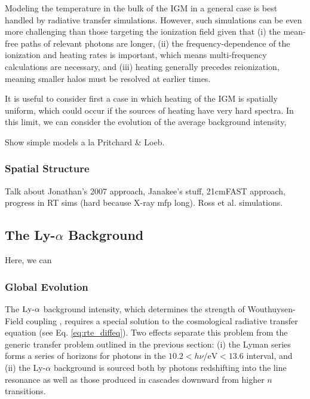 Modeling the temperature in the bulk of the IGM in a general case is best handled by radiative transfer simulations. However, such simulations can be even more challenging than those targeting the ionization field given that (i) the mean-free paths of relevant photons are longer, (ii) the frequency-dependence of the ionization and heating rates is important, which means multi-frequency calculations are necessary, and (iii) heating generally precedes reionization, meaning smaller halos must be resolved at earlier times. 

It is useful to consider first a case in which heating of the IGM is spatially uniform, which could occur if the sources of heating have very hard spectra. In this limit, we can consider the evolution of the average background intensity,



Show simple models a la Pritchard \& Loeb.



\subsubsection{Spatial Structure} \label{sec:temperature_global}



Talk about Jonathan's 2007 approach, Janakee's stuff, 21cmFAST approach, progress in RT sims (hard because X-ray mfp long). Ross et al. simulations.



\subsection{The Ly-$\alpha$ Background}
Here, we can 


\subsubsection{Global Evolution}
The $\text{Ly-}\alpha$ background intensity, which determines the strength of Wouthuysen-Field coupling \cite{Wouthuysen1952, Field1958}, requires a special solution to the cosmological radiative transfer equation (see Eq. \ref{eq:rte_diffeq}). Two effects separate this problem from the generic transfer problem outlined in the previous section: (i) the Lyman series forms a series of horizons for photons in the $10.2 < h \nu / \mathrm{eV} < 13.6$ interval, and (ii) the Ly-$\alpha$ background is sourced both by photons redshifting into the line resonance as well as those produced in cascades downward from higher $n$ transitions.

